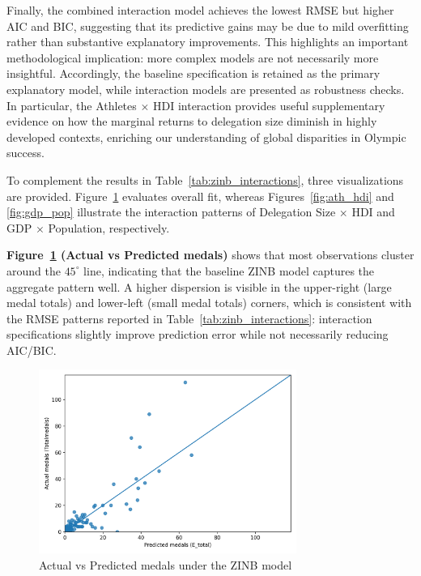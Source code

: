 \documentclass[11pt,twoside]{article}
\numberwithin{Theorem}{section}
\numberwithin{Definition}{section}
\numberwithin{Lemma}{section}
\numberwithin{Algorithm}{section}
\numberwithin{equation}{section}
\begin{document}
Finally, the combined interaction model achieves the lowest RMSE but higher AIC and BIC, suggesting that its predictive gains may be due to mild overfitting rather than substantive explanatory improvements. This highlights an important methodological implication: more complex models are not necessarily more insightful. Accordingly, the baseline specification is retained as the primary explanatory model, while interaction models are presented as robustness checks. In particular, the Athletes $\times$ HDI interaction provides useful supplementary evidence on how the marginal returns to delegation size diminish in highly developed contexts, enriching our understanding of global disparities in Olympic success.

To complement the results in Table~\ref{tab:zinb_interactions}, three visualizations are provided. Figure~\ref{fig:actual_pred} evaluates overall fit, whereas Figures~\ref{fig:ath_hdi} and \ref{fig:gdp_pop} illustrate the interaction patterns of Delegation Size $\times$ HDI and GDP $\times$ Population, respectively.

\textbf{Figure~\ref{fig:actual_pred} (Actual vs Predicted medals)} shows that most observations cluster around the $45^\circ$ line, indicating that the baseline ZINB model captures the aggregate pattern well. A higher dispersion is visible in the upper-right (large medal totals) and lower-left (small medal totals) corners, which is consistent with the RMSE patterns reported in Table~\ref{tab:zinb_interactions}: interaction specifications slightly improve prediction error while not necessarily reducing AIC/BIC.

\begin{figure}[H]
  \centering
  \includegraphics[width=0.75\textwidth]{fig_actual_vs_pred.png}
  \caption{Actual vs Predicted medals under the ZINB model}
  \label{fig:actual_pred}
\end{figure}
\end{document}
